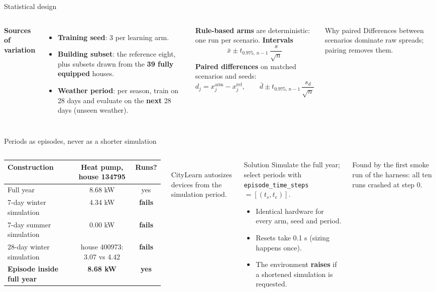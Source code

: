 \documentclass[aspectratio=169,10pt]{beamer}
\begin{document}
\begin{frame}{Statistical design}
\begin{columns}[T]
\textbf{Sources of variation}
\begin{itemize}
  \item \textbf{Training seed}: 3 per learning arm.
  \item \textbf{Building subset}: the reference eight, plus subsets drawn from the \textbf{39 fully equipped} houses.
  \item \textbf{Weather period}: per season, train on 28 days and evaluate on the \textbf{next} 28 days (unseen weather).
\end{itemize}
\textbf{Rule-based arms} are deterministic: one run per scenario.
\textbf{Intervals}
\[
\bar x \pm t_{0.975,\,n-1}\ \frac{s}{\sqrt n}
\]
\textbf{Paired differences} on matched scenarios and seeds:
\[
d_j = x^{\text{arm}}_j - x^{\text{ref}}_j, \qquad \bar d \pm t_{0.975,\,n-1}\,\frac{s_d}{\sqrt n}
\]
\begin{block}{Why paired}
Differences between scenarios dominate raw spreads; pairing removes them.
\end{block}
\end{columns}
\end{frame}

\begin{frame}{Periods as episodes, never as a shorter simulation}
\begin{columns}[T]
\scriptsize
\begin{tabular}{@{}lcc@{}}
\toprule
Construction & Heat pump, house 134795 & Runs? \\
\midrule
Full year & 8.68 kW & yes \\
7-day winter simulation & 4.34 kW & \textbf{fails} \\
7-day summer simulation & 0.00 kW & \textbf{fails} \\
28-day winter simulation & house 400973: 3.07 vs 4.42 & \textbf{fails} \\
\textbf{Episode inside full year} & \textbf{8.68 kW} & \textbf{yes} \\
\bottomrule
\end{tabular}\\[4pt]
CityLearn autosizes devices from the simulation period.
\begin{exampleblock}{Solution}
Simulate the full year; select periods with \texttt{episode\_time\_steps}$ = [(t_s, t_e)]$.
\begin{itemize}
  \item Identical hardware for every arm, seed and period.
  \item Resets take 0.1 s (sizing happens once).
  \item The environment \textbf{raises} if a shortened simulation is requested.
\end{itemize}
\end{exampleblock}
\small Found by the first smoke run of the harness: all ten runs crashed at step 0.
\end{columns}
\end{frame}
\end{document}
